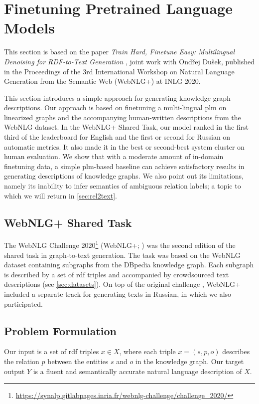\section{Finetuning Pretrained Language Models}
\label{sec:finetuning}

\begin{refbox}
    This section is based on the paper \emph{Train Hard, Finetune Easy: Multilingual Denoising for RDF-to-Text Generation} \cite{kasnerTrainHardFinetune2020}, joint work with Ondřej Dušek, published in the Proceedings of the 3rd International Workshop on Natural Language Generation from the Semantic Web (WebNLG+) at INLG 2020.
\end{refbox}


This section introduces a simple approach for generating knowledge graph descriptions. Our approach is based on finetuning a multi-lingual \ac{plm} on linearized graphs and the accompanying human-written descriptions from the WebNLG dataset. In the WebNLG+ Shared Task, our model ranked in the first third of the leaderboard for English and the first or second for Russian on automatic metrics. It also made it in the best or second-best system cluster on human evaluation. We show that with a moderate amount of in-domain finetuning data, a simple \ac{plm}-based baseline can achieve satisfactory results in generating descriptions of knowledge graphs. We also point out its limitations, namely its inability to infer semantics of ambiguous relation labels; a topic to which we will return in \autoref{sec:rel2text}.

\subsection{WebNLG+ Shared Task}
\label{sec:webnlgp}
The WebNLG Challenge 2020\footnote{\url{https://synalp.gitlabpages.inria.fr/webnlg-challenge/challenge_2020/}} (WebNLG+; \citealp{ferreira20202020}) was the second edition of the shared task in graph-to-text generation. The task was based on the WebNLG dataset containing subgraphs from the DBpedia knowledge graph. Each subgraph is described by a set of \acs{rdf} triples and accompanied by crowdsourced text descriptions (see \autoref{sec:datasets}). On top of the original challenge \cite{gardentWebNLGChallengeGenerating2017}, WebNLG+ included a separate track for generating texts in Russian, in which we also participated.


\subsection{Problem Formulation}
\label{sec:mbart}
Our input is a set of \ac{rdf} triples $x \in X$, where each triple $x = (s, p, o)$ describes the relation $p$ between the entities $s$ and $o$ in the knowledge graph. Our target output $Y$ is a fluent and semantically accurate natural language description of $X$.


